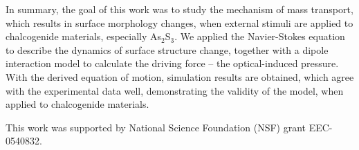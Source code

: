 \documentclass[aps, prl, twocolumn, groupedaddress]{revtex4-1}
\begin{document}

In summary, the goal of this work was to study the mechanism of mass transport,
which results in surface morphology changes, when external stimuli are
applied to chalcogenide materials, especially As$_2$S$_3$. We applied
the Navier-Stokes equation to describe the dynamics of surface
structure change, together with a dipole interaction model to
calculate the driving force -- the optical-induced pressure. With the
derived equation of motion, simulation results are obtained, which agree
with the experimental data well, demonstrating the validity of the model,
when applied to chalcogenide materials.

This work was supported by National Science Foundation (NSF) grant
EEC-0540832.

\end{document}

